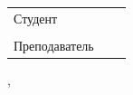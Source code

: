 \begin{center}
\vspace{2.0\baselineskip}

\begin{tabular}{p{}p{}P{0.25\textwidth}}
\large
Студент	&	 &  \\
& & \\
Преподаватель	&	 &  \\
\end{tabular}

\vfill

\City, \Year

\end{center}


